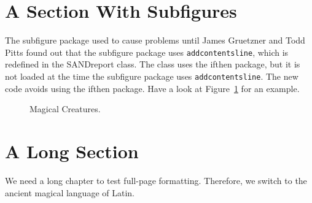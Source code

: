 \documentclass[pdf,ps2pdf,12pt,strict,OUO]{SANDreport}
\begin{document}
    \section{A Section With Subfigures}
	The subfigure package used to cause problems until James
	Gruetzner and Todd Pitts found out that the subfigure
	package uses {\tt addcontentsline}, which is redefined in
	the SANDreport class. The class uses the ifthen package,
	but it is not loaded at the time the subfigure package
	uses {\tt addcontentsline}.  The new code avoids using the
	ifthen package.  Have a look at Figure~\ref{fig:creatures}
	for an example.

	\begin{figure}[!btp]
	    \centering
	    \caption{Magical Creatures.}
	    \label{fig:creatures}
	\end{figure}



    \section{A Long Section}\label{sec:long}
	We need a long chapter to test full-page formatting. Therefore,
	we switch to the ancient magical language of Latin.
\end{document}
